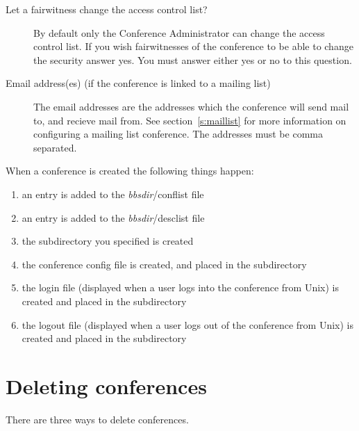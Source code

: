 \documentclass[twoside]{report}
\begin{document}
\begin{description}
      \item[Let a fairwitness change the access control list?]
         By default only the Conference Administrator can change the 
         access control list.  If you wish fairwitnesses of the conference
         to be able to change the security answer yes.  You must answer
         either yes or no to this question.

      \item[Email address(es) (if the conference is linked to a mailing list)]
         \mbox{}\newline
         The email addresses are the addresses which the conference will send
         mail to, and recieve mail from.  See section~\ref{s:maillist} 
         for more information on configuring a mailing list conference.  The
         addresses must be comma separated.
      \end{description}

         When a conference is created the following things happen:
         \begin{enumerate}
         \item an entry is added to the {\em bbsdir}/conflist file
         \item an entry is added to the {\em bbsdir}/desclist file
         \item the subdirectory you specified is created
         \item the conference config file is created, and placed in the 
            subdirectory
         \item the login file (displayed when a user logs into the conference 
            from Unix) is created and placed in the subdirectory
         \item the logout file (displayed when a user logs out of the conference 
            from Unix) is created and placed in the subdirectory
         \end{enumerate}

   \section{Deleting conferences} \label{s:delete}
      There are three ways to delete conferences.  

\renewcommand {\theenumi}{\Alph{enumi}}
\renewcommand {\labelenumi}{\theenumi.}
\end{document}
